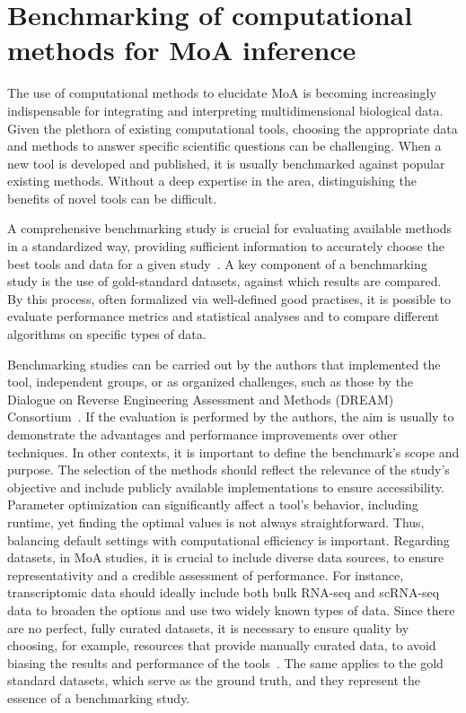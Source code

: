 \section{Benchmarking of computational methods for MoA inference} %
\label{sec:benchmarkingofcomputationalmethodsforMoAinference}

The use of computational methods to elucidate \gls{MoA} is becoming increasingly indispensable for integrating and interpreting multidimensional biological data. 
Given the plethora of existing computational tools, choosing the appropriate data and methods to answer specific scientific questions can be challenging.
When a new tool is developed and published, it is usually benchmarked against popular existing methods.
Without a deep expertise in the area, distinguishing the benefits of novel tools can be difficult. 

A comprehensive benchmarking study is crucial for evaluating available methods in a standardized way, providing sufficient information to accurately choose the best tools and data for a given study~\cite{RN108}.
A key component of a benchmarking study is the use of gold-standard datasets, against which results are compared.
By this process, often formalized via well-defined good practises, it is possible to evaluate performance metrics and statistical analyses and to compare different algorithms on specific types of data. 

Benchmarking studies can be carried out by the authors that implemented the tool, independent groups, or as organized challenges, such as those by the Dialogue on Reverse Engineering Assessment and Methods (DREAM) Consortium~\cite{RN109}.
If the evaluation is performed by the authors, the aim is usually to demonstrate the advantages and performance improvements over other techniques.
In other contexts, it is important to define the benchmark's scope and purpose.
The selection of the methods should reflect the relevance of the study's objective and include publicly available implementations to ensure accessibility.
Parameter optimization can significantly affect a tool's behavior, including runtime, yet finding the optimal values is not always straightforward.
Thus, balancing default settings with computational efficiency is important.
Regarding datasets, in \gls{MoA} studies, it is crucial to include diverse data sources, to ensure representativity and a credible assessment of performance.
For instance, transcriptomic data should ideally include both bulk \gls{RNA-seq} and \gls{scRNA-seq} data to broaden the options and use two widely known types of data.
Since there are no perfect, fully curated datasets, it is necessary to ensure quality by choosing, for example, resources that provide manually curated data, to avoid biasing the results and performance of the tools~\cite{RN109}.
The same applies to the gold standard datasets, which serve as the ground truth, and they represent the essence of a benchmarking study.

